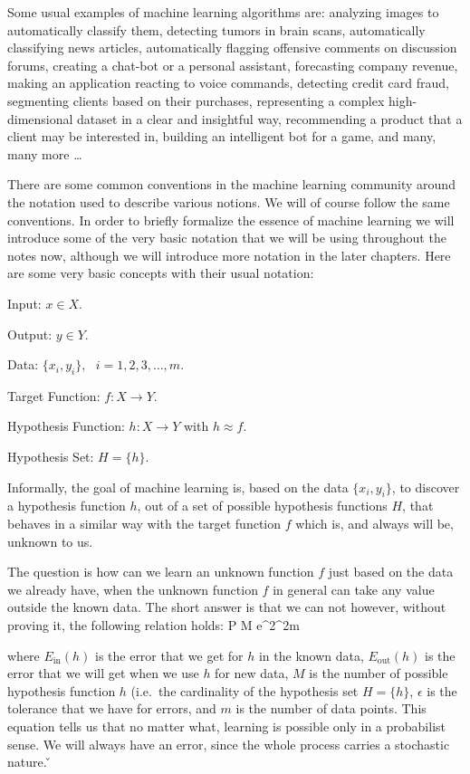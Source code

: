 \be
Some usual examples of machine learning algorithms are: analyzing images to automatically classify them, detecting
tumors in brain scans, automatically classifying news articles, automatically flagging offensive comments on
discussion forums, creating a chat-bot or a personal assistant, forecasting company revenue, making an application
reacting to voice commands, detecting credit card fraud, segmenting clients based on their purchases, representing a
complex high-dimensional dataset in a clear and insightful way, recommending a product that a client may be
interested in, building an intelligent bot for a game, and many, many more \ldots
\ee

There are some common conventions in the machine learning community around the notation used to describe various
notions. We will of course follow the same conventions. In order to briefly formalize the essence of machine learning
we will introduce some of the very basic notation that we will be using throughout the notes now, although we will
introduce more notation in the later chapters. Here are some very basic concepts with their usual notation:
\bit
\item Input: $x \in X$.
\item Output: $y \in Y$.
\item Data: $\{ x_{i}, y_{i} \}, \:\:\: i=1,2,3,\ldots, m$.
\item Target Function: $f: X \to Y$.
\item Hypothesis Function: $h: X \to Y$ with $ h \approx f$.
\item Hypothesis Set: $H = \{h\}$.
\eit

Informally, the goal of machine learning is, based on the data $\{ x_{i}, y_{i} \}$, to discover a hypothesis
function $h$, out of a set of possible hypothesis functions $H$, that behaves in a similar way with the target
function $f$ which is, and always will be, unknown to us.


The question is how can we learn an unknown function $f$ just based on the data we already have, when the unknown
function $f$ in general can take any value outside the known data. The short answer is that we can not however,
without proving it, the following relation holds:
\bse
P   \cdot M \cdot e^{2\epsilon^2m}
\ese

where $ E_{\text{in}} (h)$ is the error that we get for $h$ in the known data, $E_{\text{out}} (h)$ is the error that
we will get when we use $h$ for new data, $M$ is the number of possible hypothesis function $h$ (i.e.\ the cardinality
of the hypothesis set $H = \{h\}$, $\epsilon$ is the tolerance that we have for errors, and $m$ is the number of data
points. This equation tells us that no matter what, learning is possible only in a probabilist sense. We will always
have an error, since the whole process carries a stochastic nature. \v


